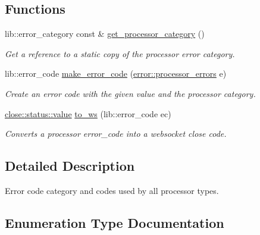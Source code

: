 \subsection*{Functions}
\begin{DoxyCompactItemize}
\item 
lib\+::error\+\_\+category const \& \hyperlink{namespacewebsocketpp_1_1processor_1_1error_ae06f6461fb27d8c8e0358c413e1d32b4}{get\+\_\+processor\+\_\+category} ()
\begin{DoxyCompactList}\small\item\em Get a reference to a static copy of the processor error category. \end{DoxyCompactList}\item 
lib\+::error\+\_\+code \hyperlink{namespacewebsocketpp_1_1processor_1_1error_afc5fc4548656f87cfee89994c95bec9c}{make\+\_\+error\+\_\+code} (\hyperlink{namespacewebsocketpp_1_1processor_1_1error_ae6510ada6a25dcd7af258b6e374e3ca5}{error\+::processor\+\_\+errors} e)
\begin{DoxyCompactList}\small\item\em Create an error code with the given value and the processor category. \end{DoxyCompactList}\item 
\hyperlink{namespacewebsocketpp_1_1close_1_1status_a8614a5c4733d708e2d2a32191c5bef84}{close\+::status\+::value} \hyperlink{namespacewebsocketpp_1_1processor_1_1error_a30c8a38f28c65b3398f88ad989186111}{to\+\_\+ws} (lib\+::error\+\_\+code ec)
\begin{DoxyCompactList}\small\item\em Converts a processor error\+\_\+code into a websocket close code. \end{DoxyCompactList}\end{DoxyCompactItemize}


\subsection{Detailed Description}
Error code category and codes used by all processor types. 

\subsection{Enumeration Type Documentation}
\hypertarget{namespacewebsocketpp_1_1processor_1_1error_ae6510ada6a25dcd7af258b6e374e3ca5}{}
